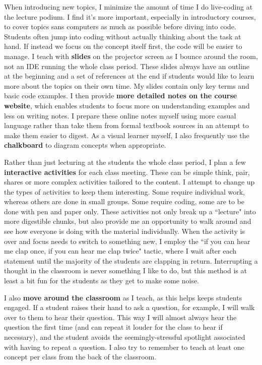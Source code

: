 \documentclass[12pt]{amsart} \usepackage{amssymb}
\begin{document}
When introducing new topics, I minimize the amount of time I do live-coding at the lecture podium. I find it's more important, especially in introductory courses, to cover topics sans computers as much as possible before diving into code. Students often jump into coding without actually thinking about the task at hand. If instead we focus on the concept itself first, the code will be easier to manage. I teach with \textbf{slides} on the projector screen as I bounce around the room, not an IDE running the whole class period. These slides always have an outline at the beginning and a set of references at the end if students would like to learn more about the topics on their own time. My slides contain only key terms and basic code examples. I then provide \textbf{more detailed notes on the course website}, which enables students to focus more on understanding examples and less on writing notes. I prepare these online notes myself using more casual language rather than take them from formal textbook sources in an attempt to make them easier to digest. As a visual learner myself, I also frequently use the \textbf{chalkboard} to diagram concepts when appropriate.

Rather than just lecturing at the students the whole class period, I plan a few \textbf{interactive activities} for each class meeting. These can be simple think, pair, shares or more complex activities tailored to the content. I attempt to change up the types of activities to keep them interesting. Some require individual work, whereas others are done in small groups. Some require coding, some are to be done with pen and paper only. These activities not only break up a ``lecture" into more digestible chunks, but also provide me an opportunity to walk around and see how everyone is doing with the material individually.
When the activity is over and focus needs to switch to something new, I employ the ``if you can hear me clap once, if you can hear me clap twice" tactic, where I wait after each statement until the majority of the students are clapping in return. Interrupting a thought in the classroom is never something I like to do, but this method is at least a bit fun for the students as they get to make some noise.

I also \textbf{move around the classroom} as I teach, as this helps keeps students engaged. If a student raises their hand to ask a question, for example, I will walk over to them to hear their question. This way I will almost always hear the question the first time (and can repeat it louder for the class to hear if necessary), and the student avoids the seemingly-stressful spotlight associated with having to repeat a question. I also try to remember to teach at least one concept per class from the back of the classroom.
\vspace{1cm}
\end{document}
